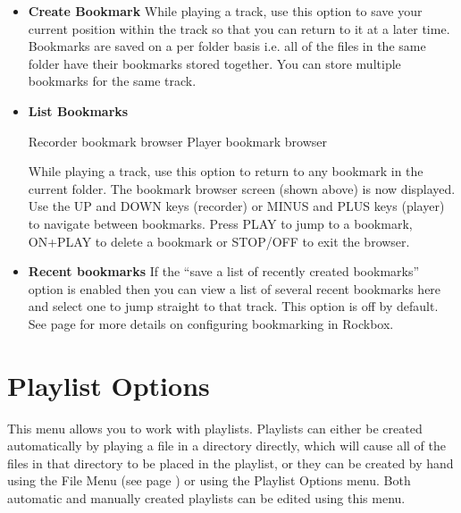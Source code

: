 \begin{itemize}

\item \textbf{Create Bookmark}
While playing a track, use this option to save your current position
within the track so that you can return to it at a later time. 
Bookmarks are saved on a per folder basis i.e. all of the files in the
same folder have their bookmarks stored together. You can store
multiple bookmarks for the same track.

\item \textbf{List Bookmarks}

Recorder bookmark browser  Player bookmark browser  

While playing a track, use this option to return to any bookmark in the current folder.  The bookmark browser
screen (shown above) is now displayed.  Use the UP and DOWN keys
(recorder) or MINUS and PLUS keys (player) to navigate between
bookmarks.  Press PLAY to jump to a bookmark, ON+PLAY to delete a
bookmark or STOP/OFF to exit the browser.

\item \textbf {Recent bookmarks}
If the ``save a list of recently created bookmarks'' option is enabled
then you can view a list of several recent bookmarks here and select
one to jump straight to that track.  This option is off by default. 
See page \pageref{ref:Bookmarkconfigactual} for more details on
configuring bookmarking in Rockbox. 

\end{itemize}

\section{\label{ref:playlistoptions}Playlist Options}
This menu allows you to work with playlists. 
Playlists can either be created automatically by playing a file in
a directory directly, which will cause all of the files in that
directory to be placed in the playlist, or they can be created by hand
using the File Menu (see page \pageref{ref:Filemenu})
or using the Playlist Options menu.  Both  automatic and manually
created playlists can be edited using this menu.

